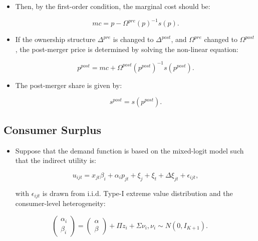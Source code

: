 \documentclass[]{book}
\providecommand{\tightlist}{%
  \setlength{\itemsep}{0pt}\setlength{\parskip}{0pt}}
\begin{document}
\begin{itemize}
\tightlist
\item
  Then, by the first-order condition, the marginal cost should be:

  \begin{equation}
  mc = p - \Omega^{pre}(p)^{-1} s(p).
  \end{equation}
\item
  If the ownership structure \(\Delta^{pre}\) is changed to
  \(\Delta^{post}\), and \(\Omega^{pre}\) changed to \(\Omega^{post}\),
  the post-merger price is determined by solving the non-linear
  equation:

  \begin{equation}
  p^{post} = mc + \Omega^{post}(p^{post})^{-1}s(p^{post}).
  \end{equation}
\item
  The post-merger share is given by:

  \begin{equation}
  s^{post} = s(p^{post}).
  \end{equation}
\end{itemize}

\subsection{Consumer Surplus}\label{consumer-surplus}

\begin{itemize}
\tightlist
\item
  Suppose that the demand function is based on the mixed-logit model
  such that the indirect utility is:

  \begin{equation}
  u_{ijt} = x_{jt} \beta_i + \alpha_i p_{jt} + \xi_{j} + \xi_t + \Delta \xi_{jt} + \epsilon_{ijt},
  \end{equation}

  with \(\epsilon_{ijt}\) is drawn from i.i.d. Type-I extreme value
  distribution and the consumer-level heterogeneity:
\end{itemize}

\begin{equation}
\begin{pmatrix}
\alpha_i \\
\beta_i
\end{pmatrix}
= 
\begin{pmatrix}
\alpha\\
\beta
\end{pmatrix}
+ \Pi z_i + \Sigma \nu_i, \nu_i \sim N(0, I_{K + 1}).
\end{equation}
\end{document}
